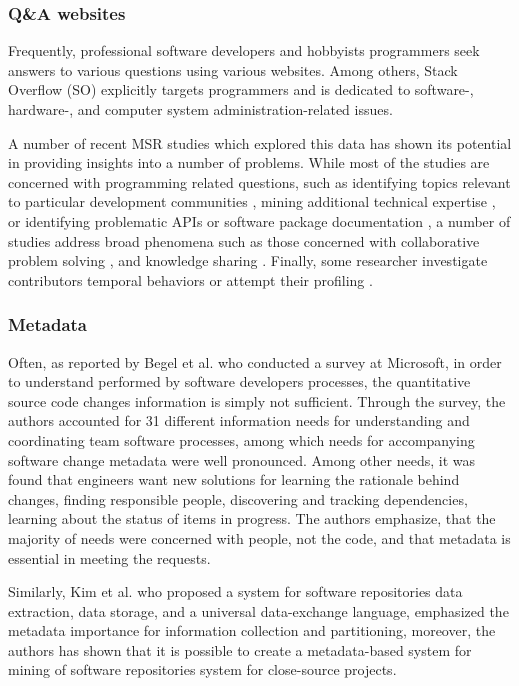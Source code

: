 \subsubsection{Q\&A websites}
Frequently, professional software developers and hobbyists programmers seek answers to various questions using various websites. 
Among others, Stack Overﬂow (SO) explicitly targets programmers and is dedicated to software-, hardware-, and computer system 
administration-related issues.

A number of recent MSR studies which explored this data has shown its potential in providing insights into a number of problems.
While most of the studies are concerned with programming related questions, such as identifying topics relevant to particular 
development communities \cite{kartik:msr14}, mining additional technical expertise \cite{VenkataramaniGAMB13} \cite{SaxeMG13}, 
or identifying problematic APIs \cite{KavalerPGCDF13} \cite{Linares2013Exploratory} or software package documentation 
\cite{Campbell2013Deficient}, 
a number of studies address broad phenomena such as those concerned with collaborative problem solving 
\cite{Tausczik2014Collaborative}, and knowledge sharing \cite{VasilescuCSCW14} \cite{Schenk2013Geo}. 
Finally, some researcher investigate contributors temporal behaviors \cite{Bosu2013Building} or attempt their profiling 
\cite{GinscaP13}.

\subsubsection{Metadata}
Often, as reported by Begel
et al. \cite{citeulike:7260421} who conducted a survey at Microsoft, in order to understand performed 
by software developers processes, the quantitative source code changes information is simply not sufficient. Through the survey,
the authors accounted for 31 different information needs for understanding and coordinating team software processes, among 
which needs for accompanying software change metadata were well pronounced. Among other needs, it was found that engineers want new 
solutions for
learning the rationale behind
changes, finding responsible people, discovering and tracking dependencies, 
learning
about the status of items in progress. The authors emphasize, that the majority of needs were concerned with people, not 
the code, and that metadata is essential in meeting the requests.

Similarly, Kim et al. \cite{citeulike:4000311} who proposed a system for software repositories data extraction, data storage, 
and a universal data-exchange language, emphasized the metadata importance for information collection and partitioning, moreover, 
the authors has shown that it is possible to create a metadata-based system for mining of software repositories system for 
close-source projects.

